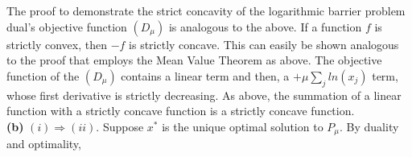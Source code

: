 \documentclass{article}
\begin{document}
\noindent 
The proof to demonstrate the strict concavity of the logarithmic barrier problem dual's objective function $(D_\mu)$ is analogous to the above.  If a function $f$ is strictly convex, then $-f$ is strictly concave.  This can easily be shown analogous to the proof that employs the Mean Value Theorem as above.  The objective function of the $(D_\mu)$ contains a linear term and then, a $+ \mu \sum_j ln(x_j)$ term, whose first derivative is strictly decreasing.  As above, the summation of a linear function with a strictly concave function is a strictly concave function. \\

\noindent
\textbf{(b)}
$(i) \Rightarrow (ii)$.
Suppose $x^*$ is the unique optimal solution to $P_\mu$.  By duality and optimality, 
\end{document}
